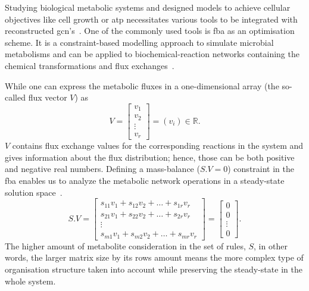 Studying biological metabolic systems and designed models to achieve cellular objectives like cell growth or \acf{atp} necessitates various tools to be integrated with reconstructed \acs{gcn}'s~\cite{KIM, HAO}. One of the commonly used tools is \acf{fba} as an optimisation scheme. It is a constraint-based modelling approach to simulate microbial metabolisms and can be applied to biochemical-reaction networks containing the chemical transformations and flux exchanges~\cite{KAUFFMAN2003491, PRICE2004}.

While one can express the metabolic fluxes in a one-dimensional array (the so-called flux vector $V$) as
\begin{equation} %
	V = \begin{bmatrix}
		v_{1} \\
		v_{2} \\
		\vdots \\
		v_{r}
	\end{bmatrix}=(v_{i})\in \mathbb{R}.
	\label{solutionvector}
\end{equation}
$V$ contains flux exchange values for the corresponding reactions in the system and gives information about the flux distribution; hence, those can be both positive and negative real numbers. Defining a mass-balance ($S.V=0$) constraint in the \acs{fba} enables us to analyze the metabolic network operations in a steady-state solution space~\cite{KAUFFMAN2003491,PRICE2004}.
\begin{equation} %
	S.V = \begin{bmatrix} 
		s_{11}v_{1} + s_{12}v_{2} + \dots + s_{1r}v_{r} \\
		s_{21}v_{1} + s_{22}v_{2} + \dots + s_{2r}v_{r} \\
		\vdots \\
		s_{m1}v_{1} + s_{m2}v_{2} + \dots + s_{mr}v_{r} 
	\end{bmatrix}=
	\begin{bmatrix} 
		0 \\
		0 \\
		\vdots \\
		0
	\end{bmatrix}.
	\label{massbalanceconstraint}
\end{equation}
The higher amount of metabolite consideration in the set of rules, $S$, in other words, the larger matrix size by its rows amount means the more complex type of organisation structure taken into account while preserving the steady-state in the whole system.

